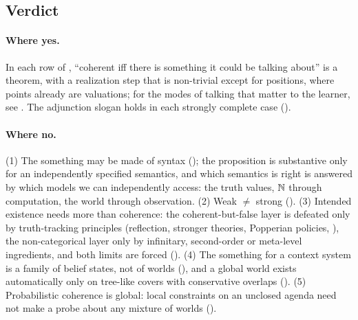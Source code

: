\subsection{Verdict}\label{sec:existence:verdict}

\paragraph{Where yes.} In each row of , ``coherent iff there is something it could be talking about'' is a theorem, with a realization step that is non-trivial except for positions, where points already are valuations; for the modes of talking that matter to the learner, see . The adjunction slogan holds in each strongly complete case ().

\paragraph{Where no.} (1) The something may be made of syntax (); the proposition is substantive only for an independently specified semantics, and which semantics is right is answered by which models we can independently access: the truth values, $\mathbb{N}$ through computation, the world through observation. (2) Weak $\neq$ strong (). (3) Intended existence needs more than coherence: the coherent-but-false layer is defeated only by truth-tracking principles (reflection, stronger theories, Popperian policies, ), the non-categorical layer only by infinitary, second-order or meta-level ingredients, and both limits are forced (). (4) The something for a context system is a family of belief states, not of worlds (), and a global world exists automatically only on tree-like covers with conservative overlaps (). (5) Probabilistic coherence is global: local constraints on an unclosed agenda need not make a probe about any mixture of worlds ().

